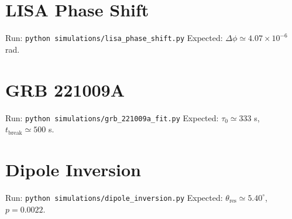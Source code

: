 \documentclass[12pt,oneside]{book}
\begin{document}
\section{LISA Phase Shift}
Run: \texttt{python simulations/lisa\_phase\_shift.py}
Expected: $\Delta \phi \simeq 4.07 \times 10^{-6}$ rad.

\section{GRB 221009A}
Run: \texttt{python simulations/grb\_221009a\_fit.py}
Expected: $\tau_0 \simeq 333$ s, $t_{\text{break}} \simeq 500$ s.

\section{Dipole Inversion}
Run: \texttt{python simulations/dipole\_inversion.py}
Expected: $\theta_{\text{res}} \simeq 5.40^\circ$, $p = 0.0022$.
\end{document}
